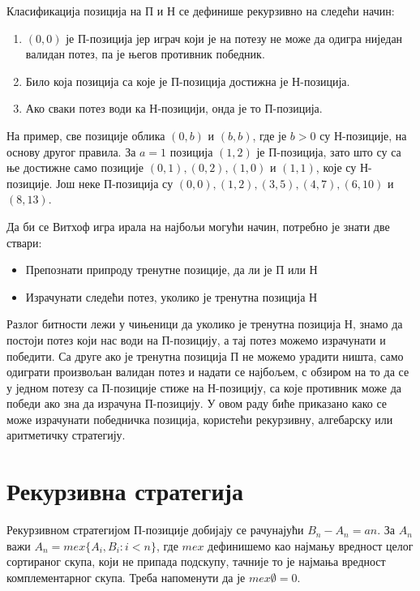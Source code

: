 \documentclass[a4paper]{article}
\begin{document}
Класификација позиција на П и Н се дефинише рекурзивно на следећи начин:
\begin{enumerate}
	\item $ (0, 0) $ је П-позиција јер играч који је на потезу не може да одигра ниједан валидан потез, па је његов противник победник.
	\item Било која позиција са које је П-позиција достижна је Н-позиција. 
	\item Ако сваки потез води ка Н-позицији, онда је то П-позиција.
\end{enumerate}

На пример, све позиције облика $ (0, b) $ и $ (b, b) $, где је $ b > 0 $ су Н-позиције, на основу другог правила. За $ a = 1 $ позиција  $ (1, 2) $  је П-позиција, зато што су са ње достижне само позиције $ (0, 1), (0, 2), (1, 0) $ и $ (1, 1) $, које су Н-позиције. Још неке П-позиција су $ (0, 0), (1, 2), (3, 5), (4, 7), (6, 10) $ и $ (8, 13) $. 

Да би се Витхоф игра ирала на најбољи могући начин, потребно је знати две ствари:
\begin{itemize}
	\item Препознати припроду тренутне позиције, да ли је П или Н
	\item Израчунати следећи потез, уколико је тренутна позиција Н
\end{itemize}

Разлог битности лежи у чињеници да уколико је тренутна позиција Н, знамо да постоји потез који нас води на П-позицију, а тај потез можемо израчунати и победити. Са друге ако је тренутна позиција П не можемо урадити ништа, само одиграти произвољан валидан потез и надати се најбољем, с обзиром на то да се у једном потезу са П-позиције стиже на Н-позицију, са које противник може да победи ако зна да израчуна П-позицију. У овом раду биће приказано како се може израчунати победничка позиција, користећи рекурзивну, алгебарску или аритметичку стратегију.

\section{Рекурзивна стратегија}
\label{sec:rekurzivna_strategija}

Рекурзивном стратегијом П-позиције добијају се рачунајући $ B_{n} - A_{n} = an $. За $ A_n $ важи $ A_{n} = mex \{ A_{i}, B_{i} : i < n \} $, где $ mex $ дефинишемо као најмању вредност целог сортираног скупа, који не припада подскупу, тачније то је најмања вредност комплементарног скупа. Треба напоменути да је $ mex \emptyset = 0 $.
\end{document}
